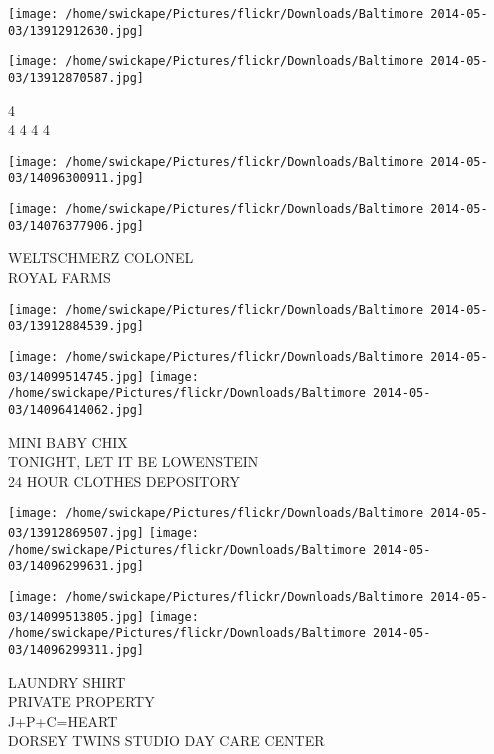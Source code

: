 \documentclass[10pt,letterpaper]{article}
\begin{document}
\texttt{[image: /home/swickape/Pictures/flickr/Downloads/Baltimore 2014-05-03/13912912630.jpg]}

\vspace{0.25in}
\texttt{[image: /home/swickape/Pictures/flickr/Downloads/Baltimore 2014-05-03/13912870587.jpg]}

4\\
4 4 4 4\\
\pagebreak

\texttt{[image: /home/swickape/Pictures/flickr/Downloads/Baltimore 2014-05-03/14096300911.jpg]}

\vspace{0.25in}
\texttt{[image: /home/swickape/Pictures/flickr/Downloads/Baltimore 2014-05-03/14076377906.jpg]}

WELTSCHMERZ COLONEL\\
ROYAL FARMS\\
\pagebreak

\texttt{[image: /home/swickape/Pictures/flickr/Downloads/Baltimore 2014-05-03/13912884539.jpg]}

\vspace{0.25in}
\texttt{[image: /home/swickape/Pictures/flickr/Downloads/Baltimore 2014-05-03/14099514745.jpg]}
\texttt{[image: /home/swickape/Pictures/flickr/Downloads/Baltimore 2014-05-03/14096414062.jpg]}

MINI BABY CHIX\\
TONIGHT, LET IT BE LOWENSTEIN\\
24 HOUR CLOTHES DEPOSITORY\\
\pagebreak

\texttt{[image: /home/swickape/Pictures/flickr/Downloads/Baltimore 2014-05-03/13912869507.jpg]}
\texttt{[image: /home/swickape/Pictures/flickr/Downloads/Baltimore 2014-05-03/14096299631.jpg]}

\texttt{[image: /home/swickape/Pictures/flickr/Downloads/Baltimore 2014-05-03/14099513805.jpg]}
\texttt{[image: /home/swickape/Pictures/flickr/Downloads/Baltimore 2014-05-03/14096299311.jpg]}

LAUNDRY SHIRT\\
PRIVATE PROPERTY\\
J+P+C=HEART\\
DORSEY TWINS STUDIO DAY CARE CENTER\\
\pagebreak
\end{document}
